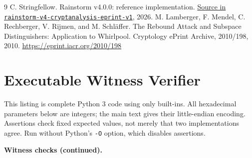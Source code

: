 \documentclass[10pt]{article}
\theoremstyle{definition}
\newcommand{\code}[1]{\texttt{#1}}
\newcommand{\archiveTag}{rainstorm-v4-cryptanalysis-eprint-v1}
\newcommand{\archiveName}{\nolinkurl{rainstorm-v4-cryptanalysis-eprint-v1}}
\newcommand{\archiveRoot}{https://github.com/DOSAYGO-STUDIO/rain}
\newcommand{\archiveFile}[2]{\href{\archiveRoot/blob/\archiveTag/#1}{#2}}
\begin{document}
\begin{thebibliography}{9}
C. Stringfellow. Rainstorm v4.0.0: reference implementation.
\archiveFile{src/rainstorm.cpp}{Source in \archiveName}, 2026.
M. Lamberger, F. Mendel, C. Rechberger, V. Rijmen, and M. Schl\"affer.
The Rebound Attack and Subspace Distinguishers: Application to Whirlpool.
Cryptology ePrint Archive, 2010/198, 2010.
\url{https://eprint.iacr.org/2010/198}
\end{thebibliography}

\clearpage
\appendix
\section{Executable Witness Verifier}\label{sec:verifier}
This listing is complete Python 3 code using only built-ins. All hexadecimal parameters below are integers; the main text gives their little-endian encoding. Assertions check fixed expected values, not merely that two implementations agree. Run without Python's \code{-O} option, which disables assertions.

\clearpage
\noindent\textbf{Witness checks (continued).}

\end{document}
